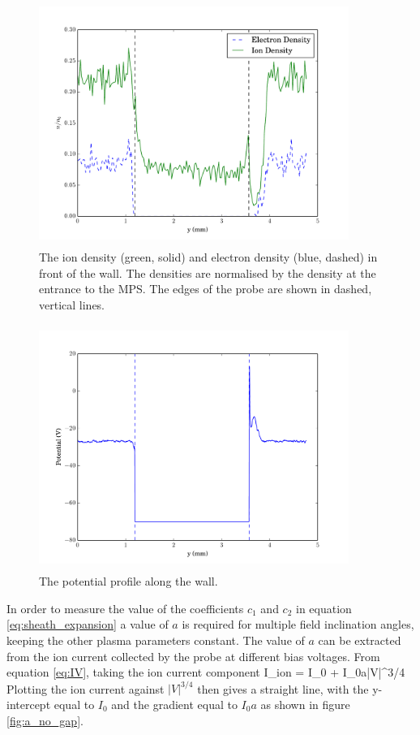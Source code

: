 \begin{figure}[]
	\centering
	\includegraphics[width=0.9\textwidth, height = 8cm]{density_in_front_of_wall_150V.pdf}
	\caption{The ion density (green, solid) and electron density (blue, dashed) in front of the wall. The densities are normalised by the density at the entrance to the MPS. The edges of the probe are shown in dashed, vertical lines.  }
	\label{fig:density_y}
\end{figure}

\begin{figure}[]
	\centering
	\includegraphics[width=0.9\textwidth, height = 8cm]{potential_on_wall.pdf}
	\caption{The potential profile along the wall. }
	\label{fig:potential}
\end{figure}

In order to measure the value of the coefficients $c_1$ and $c_2$ in equation \ref{eq:sheath_expansion} a value of $a$ is required for multiple field inclination angles, keeping the other plasma parameters constant. The value of $a$ can be extracted from the ion current collected by the probe at different bias voltages. From equation \ref{eq:IV}, taking the ion current component
\be 
I_{ion} = I_0 + I_0a{\left|V\right|}^{3/4}
\ee
Plotting the ion current against ${\left|V\right|}^{3/4}$ then gives a straight line, with the y-intercept equal to $I_0$ and the gradient equal to $I_0 a$ as shown in figure \ref{fig:a_no_gap}. 



